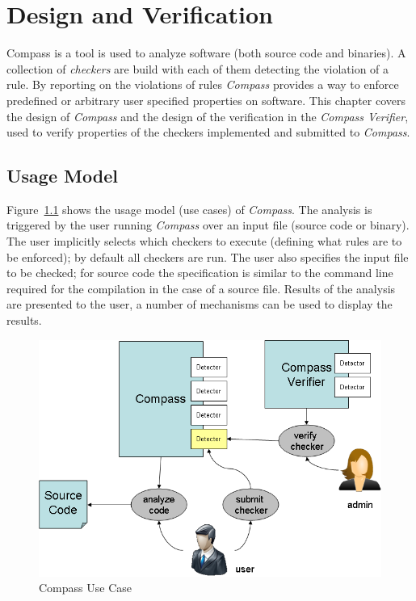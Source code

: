 
\chapter{Design and Verification}

Compass is a tool is used to analyze software (both source code and binaries). 
A collection of {\em checkers} are build with each of them detecting the 
violation of a rule.  By reporting on the violations of rules {\em Compass} provides 
a way to enforce predefined or arbitrary user specified properties on software.
This chapter covers the design of {\em Compass} and the design of the verification in 
the \emph{Compass Verifier}, used to verify properties of the checkers implemented 
and submitted to {\em Compass}.

\section{Usage Model}

\label{design::UseCase}

Figure~\ref{Compass_usecase} shows the usage model (use cases) of \emph{Compass}.
The analysis is triggered by the user running {\em Compass} over an
input file (source code or binary). The user implicitly selects 
which checkers to execute (defining what rules are to be enforced); 
by default all checkers are run. 
The user also specifies the input file to be checked; for source code 
the specification is similar to the command line required for the 
compilation in the case of a source file.  Results of the analysis 
are presented to the user, a number of mechanisms can be used to 
display the results.

\begin{figure}[th]
\includegraphics[width=4.5in]{compass_pic.png}
\caption{Compass Use Case}
\label{Compass_usecase}
\end{figure}

